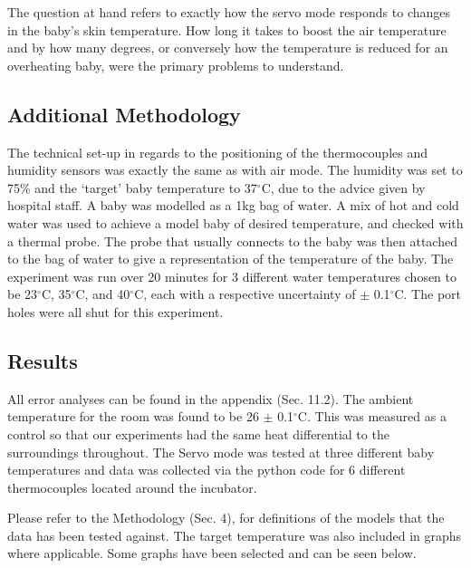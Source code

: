 \documentclass{article}
\begin{document}
The question at hand refers to exactly how the servo mode responds to changes in the baby’s skin temperature. How long it takes to boost the air temperature and by how many degrees, or conversely how the temperature is reduced for an overheating baby, were the primary problems to understand.

\subsection{Additional Methodology}
\vspace{3mm}
The technical set-up in regards to the positioning of the thermocouples and humidity sensors was exactly the same as with air mode. The humidity was set to 75\% and the ‘target’ baby temperature to 37$^{\circ}$C, due to the advice given by hospital staff. A baby was modelled as a 1kg bag of water. A mix of hot and cold water was used to achieve a model baby of desired temperature, and checked with a thermal probe. The probe that usually connects to the baby was then attached to the bag of water to give a representation of the temperature of the baby. The experiment was run over 20 minutes for 3 different water temperatures chosen to be 23$^{\circ}$C, 35$^{\circ}$C, and 40$^{\circ}$C, each with a respective uncertainty of $\pm$ 0.1$^{\circ}$C. The port holes were all shut for this experiment.

\subsection{Results}
 \vspace{3mm}
All error analyses can be found in the appendix (Sec. 11.2).
The ambient temperature for the room was found to be 26 $\pm$ 0.1$^{\circ}$C. This was measured as a control so that our experiments had the same heat differential to the surroundings throughout. The Servo mode was tested at three different baby temperatures and data was collected via the python code for 6 different thermocouples located around the incubator. 


\vspace{3mm}

Please refer to the Methodology (Sec. 4), for definitions of the models that the data has been tested against. The target temperature was also included in graphs where applicable. Some graphs have been selected and can be seen below. 
\end{document}
